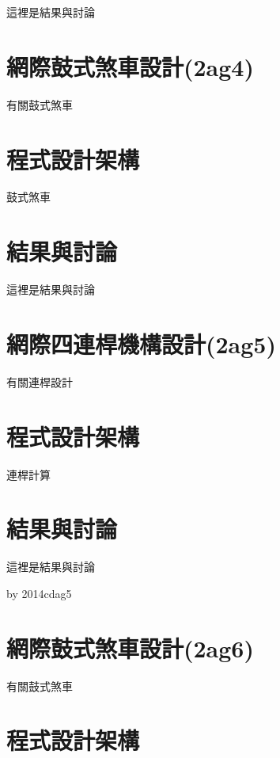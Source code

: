 \documentclass[]{article}
\begin{document}
這裡是結果與討論

\section{網際鼓式煞車設計(2ag4)}\label{ux7db2ux969bux9f13ux5f0fux715eux8ecaux8a2dux8a082ag4}

有關鼓式煞車

\section{程式設計架構}\label{ux7a0bux5f0fux8a2dux8a08ux67b6ux69cb-2}

鼓式煞車

\section{結果與討論}\label{ux7d50ux679cux8207ux8a0eux8ad6-3}

這裡是結果與討論

\section{網際四連桿機構設計(2ag5)}\label{ux7db2ux969bux56dbux9023ux687fux6a5fux69cbux8a2dux8a082ag5}

有關連桿設計

\section{程式設計架構}\label{ux7a0bux5f0fux8a2dux8a08ux67b6ux69cb-3}

連桿計算

\section{結果與討論}\label{ux7d50ux679cux8207ux8a0eux8ad6-4}

這裡是結果與討論

by 2014cdag5

\section{網際鼓式煞車設計(2ag6)}\label{ux7db2ux969bux9f13ux5f0fux715eux8ecaux8a2dux8a082ag6}

有關鼓式煞車

\section{程式設計架構}\label{ux7a0bux5f0fux8a2dux8a08ux67b6ux69cb-4}
\end{document}
